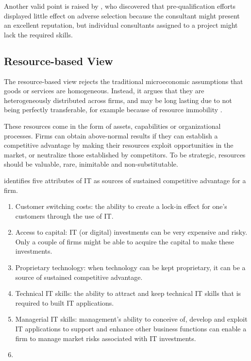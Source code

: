 \documentclass[12pt]{article}
\providecommand{\tightlist}{%
  \setlength{\itemsep}{0pt}\setlength{\parskip}{0pt}}
\begin{document}
Another valid point is raised by \citet[23]{basu2011} , who discovered
that pre-qualification efforts displayed little effect on adverse
selection because the consultant might present an excellent reputation,
but individual consultants assigned to a project might lack the required
skills.

\hypertarget{resource-based-view}{%
\subsection{Resource-based View}\label{resource-based-view}}

The resource-based view rejects the traditional microeconomic
assumptions that goods or services are homogeneous. Instead, it argues
that they are heterogeneously distributed across firms, and may be long
lasting due to not being perfectly transferable, for example because of
resource immobility \citetext{\citealp[ 392]{watjatrakul2005}; \citealp[
491]{mata1995}}.

These resources come in the form of assets, capabilities or
organizational processes. Firms can obtain above-normal results if they
can establish a competitive advantage by making their resources exploit
opportunities in the market, or neutralize those established by
competitors. To be strategic, resources should be valuable, rare,
inimitable and non-substitutable.

\citet[495-500]{mata1995} identifies five attributes of IT as sources of
sustained competitive advantage for a firm.

\begin{enumerate}
\def\labelenumi{\arabic{enumi}.}
\tightlist
\item
  Customer switching costs: the ability to create a lock-in effect for
  one's customers through the use of IT.
\item
  Access to capital: IT (or digital) investments can be very expensive
  and risky. Only a couple of firms might be able to acquire the capital
  to make these investments.
\item
  Proprietary technology: when technology can be kept proprietary, it
  can be a source of sustained competitive advantage.
\item
  Technical IT skills: the ability to attract and keep technical IT
  skills that is required to built IT applications.
\item
  Managerial IT skills: management's ability to conceive of, develop and
  exploit IT applications to support and enhance other business
  functions can enable a firm to manage market risks associated with IT
  investments.
\item
\end{enumerate}
\end{document}
